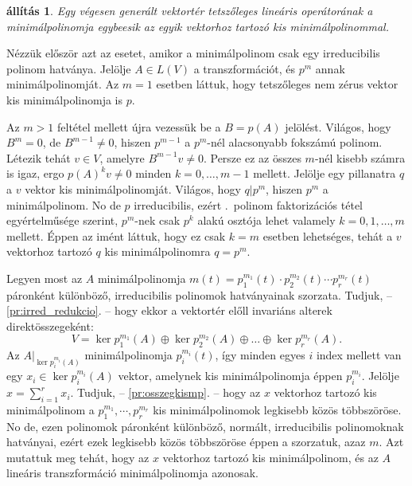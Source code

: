 \documentclass[a4paper, showtrims]{memoir}
\makeatletter
\renewenvironment{proof}[1][\proofname]
    {\par\pushQED{\qed}%
    \normalfont \topsep6\p@\@plus6\p@\relax
    \trivlist
    \item[\hskip\labelsep
        \itshape
    #1\@addpunct{:}]\ignorespaces}
    {\popQED\endtrivlist\@endpefalse}
\theoremstyle{plain}
\newtheorem{proposition}{állítás}[chapter]
\theoremstyle{remark}
\theoremstyle{definition}
\makeatother
\begin{document}
\begin{proposition}
    Egy végesen generált vektortér tetszőleges lineáris operátorának a minimálpolinomja egybeesik az egyik
    vektorhoz tartozó kis minimálpolinommal.
\end{proposition}
\begin{proof}
    Nézzük először azt az esetet, 
    amikor a minimálpolinom csak egy irreducibilis polinom hatványa.
    Jelölje $A\in L\left( V \right)$ a transzformációt, 
    és \(p^m\) annak minimálpolinomját.
    Az \(m=1\) esetben láttuk, 
    hogy tetszőleges nem zérus vektor kis minimálpolinomja is \(p\).

    Az \(m>1\) feltétel mellett újra vezessük be a \(B=p\left( A \right)\) jelölést.
    Világos, hogy \(B^m=0\), de \(B^{m-1}\neq 0\), 
    hiszen \(p^{m-1}\) a \(p^m\)-nél alacsonyabb fokszámú polinom.
    Létezik tehát \(v\in V\), amelyre \(B^{m-1}v\neq 0\).
    Persze ez az összes \(m\)-nél kisebb számra is igaz,
    ergo \(p(A)^{k}v\neq 0\) minden \(k=0,\dots,m-1\) mellett.
    Jelölje egy pillanatra \(q\) a \(v\) vektor kis minimálpolinomját.
    Világos, hogy \(q|p^m\), hiszen \(p^m\) a minimálpolinom.
    No de \(p\) irreducibilis, ezért .~polinom faktorizációs tétel egyértelműsége szerint,
    \(p^m\)-nek csak \(p^k\) alakú osztója lehet valamely \(k=0,1,\dots,m\) mellett.
    Éppen az imént láttuk, hogy ez csak \(k=m\) esetben lehetséges,
    tehát a \(v\) vektorhoz tartozó \(q\) kis minimálpolinomra \(q=p^m\).
    

	Legyen most az \(A\) minimálpolinomja 
	$
		m\left( t \right)
		=
		p_1^{m_1}\left( t \right)\cdot
		p_2^{m_2}\left( t \right)\cdots
		p_r^{m_r}\left( t \right)
	$
    páronként különböző, 
    irreducibilis polinomok hatványainak szorzata.
    Tudjuk, -- \ref{pr:irred_redukcio}. --
    hogy ekkor a vektortér előll invariáns alterek direktösszegeként:
	\[
		V
		=
		\ker p_1^{m_1}\left( A \right)
		\oplus
		\ker p_2^{m_2}\left( A \right)
		\oplus\dots\oplus
		\ker p_r^{m_r}\left( A \right).
	\]
	Az $A|_{\ker p_i^{m_i}\left( A \right)}$ minimálpolinomja $p_i^{m_i}\left( t \right)$, 
    így minden egyes $i$ index mellett van egy \(x_i\in\ker p_i^{m_i}\left( A \right)\) vektor,
    amelynek kis minimálpolinomja éppen \(p_i^{m_i}\).
    Jelölje \(x=\sum_{i=1}^rx_i\).
    Tudjuk, -- \ref{pr:osszegkismp}. --
    hogy az \(x\) vektorhoz tartozó kis minimálpolinom a \(p_1^{m_1},\cdots,p_r^{m_r}\)
    kis minimálpolinomok legkisebb közös többszöröse.
    No de, ezen polinomok páronként különböző, normált, irreducibilis polinomoknak hatványai, 
    ezért ezek legkisebb közös többszöröse éppen a szorzatuk, azaz \(m\).
    Azt mutattuk meg tehát,
    hogy az \(x\) vektorhoz tartozó kis minimálpolinom, 
    és az \(A\) lineáris transzformáció minimálpolinomja azonosak.
\end{proof}
\end{document}
